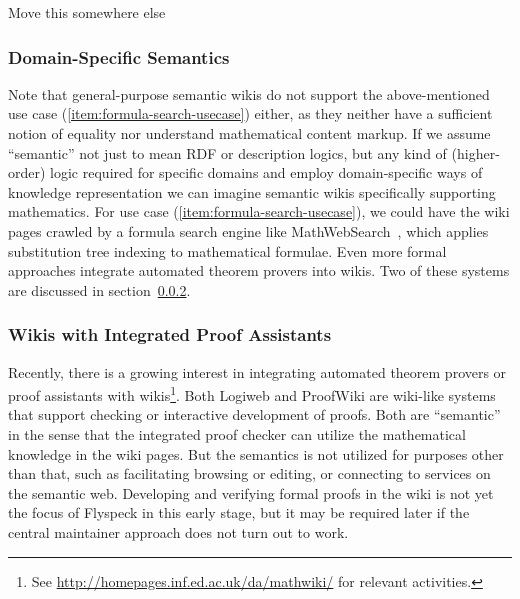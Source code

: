 \begin{oldpart}{Move this somewhere else}
  \subsubsection{Domain-Specific Semantics}
  \label{sec:domain-semantics}

  Note that general-purpose semantic wikis do not support the above-mentioned use case   (\ref{item:formula-search-usecase}) either, as they neither have a sufficient notion of equality   nor understand mathematical content markup.  If we assume ``semantic'' not just to mean RDF or   description logics, but any kind of (higher-order) logic required for specific   domains and employ domain-specific ways of knowledge representation we can imagine semantic   wikis specifically supporting mathematics.  For use case (\ref{item:formula-search-usecase}), we   could have the wiki pages crawled by a formula search engine like   MathWebSearch~\cite{KohSuc:asemf06}, which applies substitution tree indexing to mathematical   formulae.  Even more formal approaches integrate automated theorem provers into wikis.  Two of   these systems are discussed in section~\ref{sec:wiki-pa}.
\end{oldpart}

\subsubsection{Wikis with Integrated Proof Assistants}
\label{sec:wiki-pa}

Recently, there is a growing interest in integrating automated theorem provers or proof
assistants with wikis\footnote{See \url{http://homepages.inf.ed.ac.uk/da/mathwiki/} for
  relevant activities.}.  Both Logiweb and ProofWiki are wiki-like systems that support
checking or interactive development of proofs.  Both are ``semantic'' in the sense that
the integrated proof checker can utilize the mathematical knowledge in the wiki pages.
But the semantics is not utilized for purposes other than that, such as facilitating
browsing or editing, or connecting to services on the semantic web.  Developing and
verifying formal proofs in the wiki is not yet the focus of Flyspeck in this early stage,
but it may be required later if the central maintainer approach does not turn out to work.

